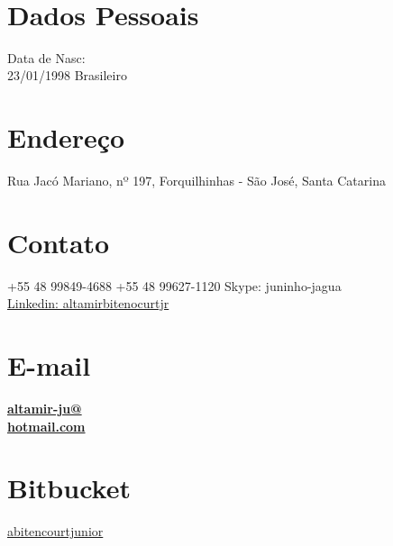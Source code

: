 \documentclass[]{friggeri-cv}
\begin{document}
{}
\\

\begin{aside}
    \section{Dados Pessoais}
    \singlespacing
    Data de Nasc: \\ 23/01/1998
    Brasileiro
    ~
    \section{Endereço}
    \singlespacing
    Rua Jacó Mariano, nº 197, Forquilhinhas - São José,
    Santa Catarina
    ~
    \section{Contato}
    \singlespacing
    +55 48 99849-4688
    +55 48 99627-1120
    Skype: juninho-jagua\\
    \href{https://goo.gl/5WVW6W}{Linkedin: altamirbitenocurtjr}
    ~
    \section{E-mail}
    \singlespacing
    \href{mailto:altamir-ju@hotmail.com}{\textbf{altamir-ju@\\hotmail.com}}
    ~
    \section{Bitbucket}
    \singlespacing
    \href{https://bitbucket.org/abitencourtjunior/}{abitencourtjunior}
    ~
    ~

\end{aside}
\end{document}
